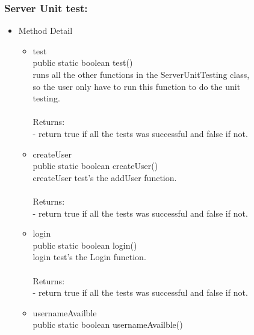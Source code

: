 \documentclass[letterpaper]{article}
\begin{document}
						\subsubsection*{Server Unit test:}
						\vspace{0.1in}	
							\begin{itemize}
								\item	Method Detail
										\begin{itemize}
											\item	test \\
													 public static boolean test() \\
		
													runs all the other functions in the ServerUnitTesting class,\\											so the user only have to run this function to do the unit \\ testing. \\ \\
													Returns: \\
													- return true if all the tests was successful and false if not.
													
													\item	createUser \\
													 public static boolean createUser() \\
		
													createUser test's the addUser function. \\ \\
													Returns: \\
													- return true if all the tests was successful and false if not.
													
													\item	login \\
													  public static boolean login() \\
		
													login test's the Login function. \\ \\
													Returns: \\
													- return true if all the tests was successful and false if not.
													
													\item	usernameAvailble \\
													 public static boolean usernameAvailble() \\
		

\end{itemize}
\end{itemize}
\end{document}
